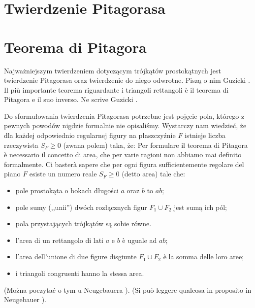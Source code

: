 
%

\section{Twierdzenie Pitagorasa} %
\section{Teorema di Pitagora} %

Najważniejszym twierdzeniem dotyczącym trójkątów prostokątnych jest twierdzenie Pitagorasa oraz twierdzenie do niego odwrotne. %
Piszą o nim Guzicki \cite[s. 160]{guzicki_2021}. %
Il più importante teorema riguardante i triangoli rettangoli è il teorema di Pitagora e il suo inverso. %
Ne scrive Guzicki \cite[p. 160]{guzicki_2021}. %


Do sformułowania twierdzenia Pitagorasa potrzebne jest pojęcie pola, którego z pewnych powodów nigdzie formalnie nie opisaliśmy. %
Wystarczy nam wiedzieć, że dla każdej odpowiednio regularnej figury na płaszczyźnie $F$ istnieje liczba rzeczywista $S_F \ge 0$ (zwana polem) taka, że: %
Per formulare il teorema di Pitagora è necessario il concetto di area, che per varie ragioni non abbiamo mai definito formalmente. %
Ci basterà sapere che per ogni figura sufficientemente regolare del piano $F$ esiste un numero reale $S_F \ge 0$ (detto area) tale che: %
\begin{itemize}
    \item pole prostokąta o bokach długości $a$ oraz $b$ to $ab$; %
    \item pole sumy (,,unii'') dwóch rozłącznych figur $F_1 \cup F_2$ jest sumą ich pól; %
    \item pola przystających trójkątów są sobie równe. %
    \item l'area di un rettangolo di lati $a$ e $b$ è uguale ad $ab$; %
    \item l'area dell'unione di due figure disgiunte $F_1 \cup F_2$ è la somma delle loro aree; %
    \item i triangoli congruenti hanno la stessa area. %
\end{itemize}

(Można poczytać o tym u Neugebauera \cite[s. 37]{neugebauer_2018}). %
(Si può leggere qualcosa in proposito in Neugebauer \cite[p. 37]{neugebauer_2018}). %

